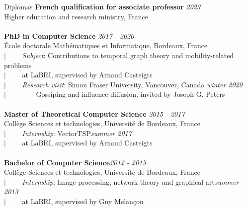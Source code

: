 \documentclass[french]{resume} %
\begin{document}
	\begin{rSection}{Diplomas}
		{\bf French qualification for associate professor} \hfill {\em 2023}
		\\ Higher education and research ministry, France 
		\\ \\
		{\bf PhD in Computer Science} \hfill {\em 2017 - 2020} 
		\\ École doctorale Mathématiques et Informatique, Bordeaux, France
		\\ $| \qquad$ \textit{Subject}: Contributions to temporal graph theory and mobility-related problems
		\\ $| \qquad$ at LaBRI, supervised by Arnaud Casteigts
		\\ $| \qquad$ \textit{Research visit}: Simon Fraser University, Vancouver, Canada \hfill {\em winter 2020}
		\\ $| \qquad \qquad$ Gossiping and influence diffusion, invited by Joseph G. Peters 
		\\ \\
		{\bf Master of Theoretical Computer Science} \hfill {\em 2015 -  2017} 
		\\ Collège Sciences et technologies, Université de Bordeaux, France 
		\\ $| \qquad$ \textit{Internship}: VectorTSP\hfill {\em summer 2017} 
		\\ $| \qquad $ at LaBRI, supervised by Arnaud Casteigts
		\\ \\ 
		\textbf{Bachelor of Computer Science}\hfill {\em 2012 -  2015} 
		\\ Collège Sciences et technologies, Université de Bordeaux, France 
		\\ $| \qquad$ \textit{Internship}: Image processing, network theory and graphical art\hfill {\em summer 2013} 
		\\ $|  \qquad $ at LaBRI, supervised by Guy Melançon
	\end{rSection}
\end{document}
